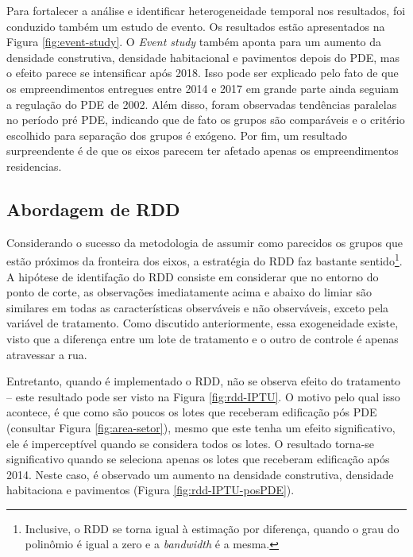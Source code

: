 Para fortalecer a análise e identificar heterogeneidade temporal nos resultados, foi conduzido também um estudo de evento. Os resultados estão apresentados na Figura \ref{fig:event-study}. O \textit{Event study} também aponta para um aumento da densidade construtiva, densidade habitacional e pavimentos depois do PDE, mas o efeito parece se intensificar após 2018. Isso pode ser explicado pelo fato de que os empreendimentos entregues entre 2014 e 2017 em grande parte ainda seguiam a regulação do PDE de 2002. Além disso, foram observadas tendências paralelas no período pré PDE, indicando que de fato os grupos são comparáveis e o critério escolhido para separação dos grupos é exógeno. Por fim, um resultado surpreendente é de que os eixos parecem ter afetado apenas os empreendimentos residencias.

\subsection{Abordagem de RDD}

Considerando o sucesso da metodologia de assumir como parecidos os grupos que estão próximos da fronteira dos eixos, a estratégia do RDD faz bastante sentido\footnote{Inclusive, o RDD se torna igual à estimação por diferença, quando o grau do polinômio é igual a zero e a \textit{bandwidth} é a mesma.}. A hipótese de identifação do RDD consiste em considerar que no entorno do ponto de corte, as observações imediatamente acima e abaixo do limiar são similares em todas as características observáveis e não observáveis, exceto pela variável de tratamento. Como discutido anteriormente, essa exogeneidade existe, visto que a diferença entre um lote de tratamento e o outro de controle é apenas atravessar a rua.

Entretanto, quando é implementado o RDD, não se observa efeito do tratamento -- este resultado pode ser visto na Figura \ref{fig:rdd-IPTU}. O motivo pelo qual isso acontece, é que como são poucos os lotes que receberam edificação pós PDE (consultar Figura \ref{fig:area-setor}), mesmo que este tenha um efeito significativo, ele é imperceptível quando se considera todos os lotes. O resultado torna-se significativo quando se seleciona apenas os lotes que receberam edificação após 2014. Neste caso, é observado um aumento na densidade construtiva, densidade habitaciona e pavimentos (Figura \ref{fig:rdd-IPTU-posPDE}). 

